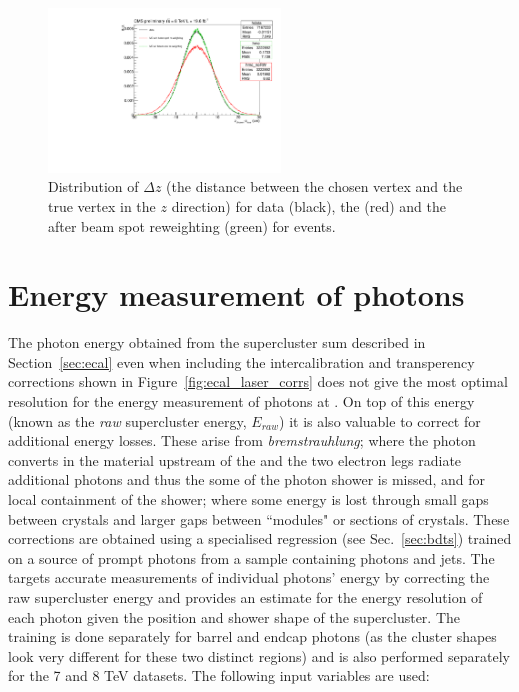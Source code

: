 \begin{figure}
  \begin{center}
  \includegraphics[width=0.55\textwidth]{analysis_comps/plots/beamspot.pdf}
  \caption{Distribution of $\Delta z$ (the distance between the chosen vertex and the true vertex in the $z$ direction) for data (black), the \MC (red) and the \MC after beam spot reweighting (green) for \Zmumu events.}
  \label{fig:beamspot}
  \end{center}
\end{figure}

\section{Energy measurement of photons}
\label{sec:photon_energy}

The photon energy obtained from the supercluster sum described in Section~\ref{sec:ecal} even when including the intercalibration and transperency corrections shown in Figure~\ref{fig:ecal_laser_corrs} does not give the most optimal resolution for the energy measurement of photons at \CMS. On top of this energy (known as the \emph{raw} supercluster energy, $E_{raw}$) it is also valuable to correct for additional energy losses. These arise from \emph{bremstrauhlung}; where the photon converts in the material upstream of the \ECAL and the two electron legs radiate additional photons and thus the some of the photon shower is missed, and for local containment of the shower; where some energy is lost through small gaps between \ECAL crystals and larger gaps between ``modules" or sections of crystals. These corrections are obtained using a specialised regression \BDT (see Sec.~\ref{sec:bdts}) trained on a \MC source of prompt photons from a sample containing photons and jets. The \BDT targets accurate measurements of individual photons' energy by correcting the raw supercluster energy and provides an estimate for the energy resolution of each photon given the position and shower shape of the supercluster. The training is done separately for barrel and endcap photons (as the cluster shapes look very different for these two distinct regions) and is also performed separately for the 7 and 8 TeV datasets. The following input variables are used:

